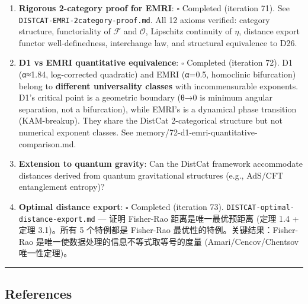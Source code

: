 \documentclass[
]{article}
\providecommand{\tightlist}{%
  \setlength{\itemsep}{0pt}\setlength{\parskip}{0pt}}
\begin{document}
\begin{enumerate}
\def\labelenumi{\arabic{enumi}.}
\tightlist
\item
  \textbf{Rigorous 2-category proof for EMRI}: \(\square\) Completed
  (iteration 71). See \texttt{DISTCAT-EMRI-2category-proof.md}. All 12
  axioms verified: category structure, functoriality of \(\mathcal{F}\)
  and \(\mathcal{O}\), Lipschitz continuity of \(\eta\), distance export
  functor well-definedness, interchange law, and structural equivalence
  to D26.
\item
  \textbf{D1 vs EMRI quantitative equivalence}: \(\square\) Completed
  (iteration 72). D1 (α≈1.84, log-corrected quadratic) and EMRI (α=0.5,
  homoclinic bifurcation) belong to \textbf{different universality
  classes} with incommensurable exponents. D1's critical point is a
  geometric boundary (θ→0 is minimum angular separation, not a
  bifurcation), while EMRI's is a dynamical phase transition
  (KAM-breakup). They share the DistCat 2-categorical structure but not
  numerical exponent classes. See
  memory/72-d1-emri-quantitative-comparison.md.
\item
  \textbf{Extension to quantum gravity}: Can the DistCat framework
  accommodate distances derived from quantum gravitational structures
  (e.g., AdS/CFT entanglement entropy)?
\item
  \textbf{Optimal distance export}: \(\square\) Completed (iteration
  73). \texttt{DISTCAT-optimal-distance-export.md} --- 证明 Fisher-Rao
  距离是唯一最优预距离 (定理 1.4 + 定理 3.1)。所有 5 个特例都是
  Fisher-Rao 最优性的特例。关键结果：Fisher-Rao
  是唯一使数据处理的信息不等式取等号的度量 (Amari/Cencov/Chentsov
  唯一性定理)。
\end{enumerate}

\begin{center}\rule{0.5\linewidth}{0.5pt}\end{center}

\subsection{References}\label{references}
\end{document}
